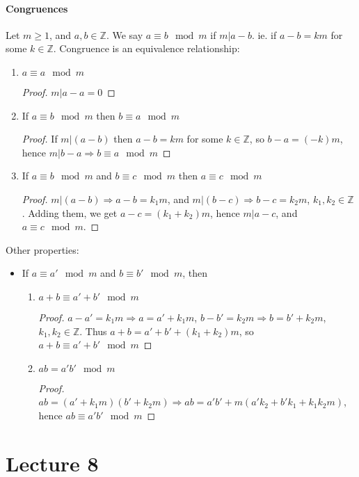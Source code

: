\documentclass[10pt,letter]{article}
\theoremstyle{plain}
\theoremstyle{definition}
\begin{document}
\paragraph{Congruences}
Let $m\geq1$, and $a,b\in\mathbb{Z}$. We say $a\equiv b\mod{m}$ if $m|a-b$. ie. if $a-b=km$ for some $k\in\mathbb{Z}$. Congruence is an equivalence relationship: 
\begin{enumerate}
    \item $a\equiv a\mod{m}$ 
    \begin{proof}
    $m|a-a=0$
    \end{proof}
    \item If $a\equiv b\mod{m}$ then $b\equiv a\mod{m}$ 
    \begin{proof}
    If $m|(a-b)$ then $a-b=km$ for some $k\in\mathbb{Z}$, so $b-a=(-k)m$, hence $m|b-a\Rightarrow b\equiv a\mod{m}$
    \end{proof}
    \item If $a\equiv b\mod{m}$ and $b\equiv c\mod{m}$ then $a\equiv c\mod{m}$ 
    \begin{proof}
    $m|(a-b)\Rightarrow a-b=k_1m$, and $m|(b-c)\Rightarrow b-c=k_2m$, $k_1,k_2\in\mathbb{Z}$. Adding them, we get $a-c=(k_1+k_2)m$, hence $m|a-c$, and $a\equiv c\mod{m}$.
    \end{proof}
\end{enumerate}
Other properties: 
\begin{itemize}
    \item If $a\equiv a'\mod{m}$ and $b\equiv b'\mod{m}$, then 
    \begin{enumerate}
        \item $a+b\equiv a'+b'\mod{m}$ 
        \begin{proof}
        $a-a'=k_1m\Rightarrow a=a'+k_1m$, $b-b'=k_2m\Rightarrow b=b'+k_2m$, $k_1,k_2\in\mathbb{Z}$. Thus $a+b=a'+b'+(k_1+k_2)m$, so $a+b\equiv a'+b'\mod{m}$ 
        \end{proof}
        \item $ab=a'b'\mod{m}$
        \begin{proof}
        $ab=(a'+k_1m)(b'+k_2m)\Rightarrow ab=a'b'+m(a'k_2+b'k_1+k_1k_2m)$, hence $ab\equiv a'b'\mod{m}$ 
        \end{proof}
    \end{enumerate}
\end{itemize}

\section*{Lecture 8}
\end{document}
